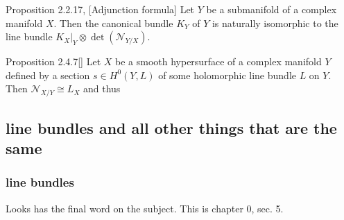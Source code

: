 \begin{thing4}{Proposition 2.2.17, \cite{huc}}[Adjunction formula]\label{prop:2.2.17}\leavevmode
Let \(Y\) be a submanifold of a complex manifold \(X\). Then the canonical bundle \(K_Y\) of \(Y\) is naturally isomorphic to the line bundle \(K_X|_{Y} \otimes \det(\mathcal{N}_{Y/X})\).
\end{thing4}

\begin{thing4}{Proposition 2.4.7}[\cite{huc}]\label{prop:2.4.7}\leavevmode
Let \(X\) be a smooth hypersurface of a complex manifold \(Y\) defined by a section \(s \in H^{0}(Y,L)\) of some holomorphic line bundle \(L\) on \(Y\). Then \(\mathcal{N}_{X/Y}\cong L_X\) and thus 
\end{thing4}

\subsection{line bundles and all other things that are the same}

\subsubsection{line bundles}

Looks \cite{gri} has the final word on the subject. This is chapter 0, sec. 5.

